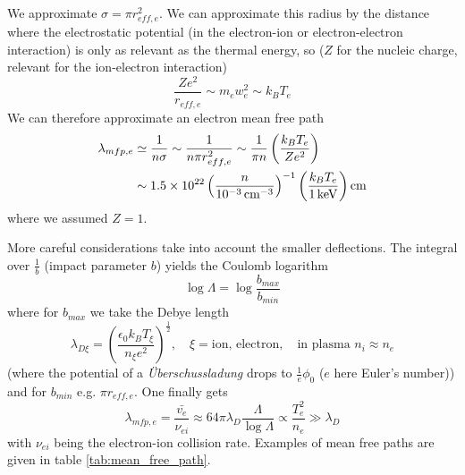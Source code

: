 We approximate $\sigma = \pi r_{eff,e}^2$. We can approximate this radius by the distance where the electrostatic potential
(in the electron-ion or electron-electron interaction) is only as relevant as the thermal energy, so ($Z$ for the nucleic charge,
relevant for the ion-electron interaction)
\begin{equation}
    \frac{Ze^2}{r_{eff,e}} \sim m_e w_e^2 \sim k_B T_e
\end{equation}
We can therefore approximate an electron mean free path
\begin{equation}
    \begin{aligned}
        \lambda_{mfp,e} &\simeq \frac{1}{n\sigma} \sim \frac{1}{n\pi r_{eff,e}^2} \sim \frac{1}{\pi n} \left( \frac{k_B T_e}{Ze^2} \right) \\
                        &\sim 1.5 \times 10^{22} \left( \frac{n}{10^{-3} \operatorname{cm}^{-3}} \right)^{-1} \left( \frac{k_B T_e}{1 \operatorname{keV}} \right) \operatorname{cm}
    \end{aligned}
\end{equation}
where we assumed $Z = 1$.

More careful considerations take into account the smaller deflections. The integral over $\frac{1}{b}$
(impact parameter $b$) yields the
Coulomb logarithm
\begin{equation}
    \log \Lambda = \log \frac{b_{max}}{b_{min}}
\end{equation}
where for $b_{max}$ we take the Debye length
\begin{equation}
    \lambda_{D\xi} = \left( \frac{\epsilon_0 k_B T_\xi}{n_\xi e^2} \right) ^ \frac{1}{2}, \quad \xi = \text{ion, electron}, \quad \text{in plasma } n_i \approx n_e
\end{equation}
(where the potential of a \textit{Überschussladung} drops to $\frac{1}{e} \phi_0$ ($e$ here Euler's number))
and for $b_{min}$ e.g. $\pi r_{eff,e}$. One finally gets
\begin{equation}
    \lambda_{mfp,e} = \frac{\bar{v_e}}{\nu_{ei}} \approx 64 \pi \lambda_D \frac{\Lambda}{\log \Lambda} \propto \frac{T_e^2}{n_e} \gg \lambda_D
\end{equation}
with $\nu_{ei}$ being the electron-ion collision rate. Examples of mean free paths are given in table \ref{tab:mean_free_path}.

